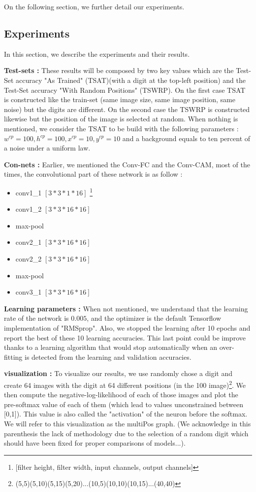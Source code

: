 			On the following section, we further detail our experiments.

		\subsection{Experiments}
		\label{sub:experiments}
			In this section, we describe the experiments and their results. 

			\textbf{Test-sets :} These results will be composed by two key values which are the Test-Set accuracy "As Trained" (TSAT)(with a digit at the top-left position) and the Test-Set accuracy "With Random Positions" (TSWRP). On the first case TSAT is constructed like the train-set (same image size, same image position, same noise) but the digits are different. On the second case the TSWRP is constructed likewise but the position of the image is selected at random. 
			When nothing is mentioned, we consider the TSAT to be build with the following parameters : $w^{cp}=100,h^{cp}=100, x^{cp}=10,y^{cp}=10$ and a background equals to ten percent of a noise under a uniform law.

			\textbf{Con-nets :}
			Earlier, we mentioned the Conv-FC and the Conv-CAM, most of the times, the convolutional part of these network is as follow :
			\begin{itemize}
				\setlength\itemsep{-0.4em}
				\item conv1\_1 $[3*3*1*16]$ \footnote{[filter height, filter width, input channels, output channels]}
				\item conv1\_2 $[3*3*16*16]$
				\item max-pool
				\item conv2\_1 $[3*3*16*16]$
				\item conv2\_2 $[3*3*16*16]$
				\item max-pool
				\item conv3\_1 $[3*3*16*16]$
			\end{itemize}

			\textbf{Learning parameters :} When not mentioned, we understand that the learning rate of the network is $0.005$, and the optimizer is the default Tensorflow implementation of "RMSprop". Also, we stopped the learning after 10 epochs and report the best of these 10 learning accuracies. This last point could be improve thanks to a learning algorithm that would stop automatically when an over-fitting is detected from the learning and validation accuracies.

			\textbf{visualization :} To visualize our results, we use randomly chose a digit and create 64 images with the digit at 64 different positions (in the 100 image)\footnote{(5,5)(5,10)(5,15)(5,20)...(10,5)(10,10)(10,15)...(40,40)}. We then compute the negative-log-likelihood of each of those images and plot the pre-softmax value of each of them (which lead to values unconstrained between [0,1]). This value is also called the "activation" of the neuron before the softmax. We will refer to this visualization as the multiPos graph. (We acknowledge in this parenthesis the lack of methodology due to the selection of a random digit which should have been fixed for proper comparisons of models...).

